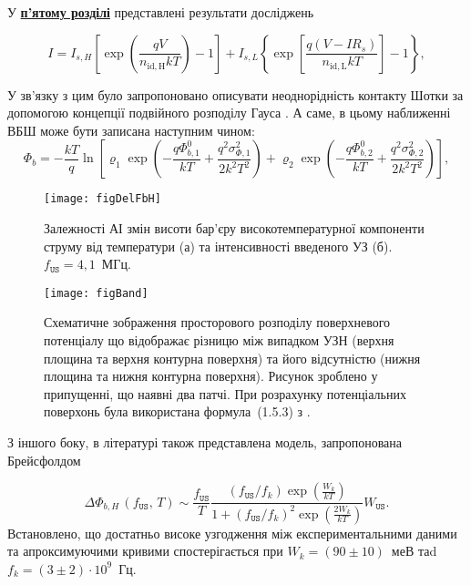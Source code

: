 \documentclass[a5paper,10pt,twoside,openany,article]{memoir} %
\begin{document}
У  \underline{\textbf{п'ятому розділі}} представлені результати досліджень

\begin{equation}
\label{eqSDB_IV}
  I=I_{s,H}\left[\exp\left(\frac{qV}{n_\mathrm{id,H}kT}\right)-1\right]+
 I_{s,L}\left\{\exp\left[\frac{q(V-IR_s)}{n_\mathrm{id,L}kT}\right]-1\right\},
\end{equation}


У зв'язку з цим було запропоновано описувати неоднорідність контакту Шотки за допомогою концепції подвійного розподілу Гауса \cite{Jiang:DG}.
А саме, в цьому наближенні ВБШ може бути записана наступним чином:
\begin{equation}
\label{eqDG}
  \Phi_b=-\frac{kT}{q}\ln\left[\varrho_1\exp\left(-\frac{q\Phi_{b,1}^0}{kT}+
  \frac{q^2\sigma^2_{\Phi,1}}{2k^2T^2}\right)
   +
  \varrho_2\exp\left(-\frac{q\Phi_{b,2}^{0}}{kT}+
  \frac{q^2\sigma^2_{\Phi,2}}{2k^2T^2}\right)\right],
\end{equation}

\begin{figure}
\center
\texttt{[image: figDelFbH]}
\caption{\label{figDelFbH}
Залежності АІ змін висоти бар'єру високотемпературної компоненти струму від температури (а) та інтенсивності введеного УЗ (б).
$f_\mathtt{US}=4,1$~МГц.
}%
\end{figure}


\begin{figure}
\center
\texttt{[image: figBand]}
\caption{\label{figBand}
Схематичне зображення 
просторового розподілу поверхневого потенціалу
що відображає різницю між випадком УЗН (верхня площина та верхня контурна поверхня) та
його відсутністю (нижня площина та нижня контурна поверхня).
Рисунок зроблено у припущенні, що наявні два патчі.
При розрахунку потенціальних поверхонь була використана формула~(1.5.3) з \cite{Tung:MSE}.
}%
\end{figure}


З іншого боку, в літературі \cite{Brailsford} також представлена модель, запропонована Брейсфолдом

\begin{equation}
\label{eqBr}
\Delta\Phi_{b,H}\,(f_\mathtt{US},\,T)\sim\frac{f_\mathtt{US}}{T}\frac{(f_\mathtt{US}/{f_k})\exp\left(\frac{W_k}{kT}\right)}
{1+(f_\mathtt{US}/{f_k})^2\exp\left(\frac{2W_k}{kT}\right)}W_\mathtt{US}.
\end{equation}
Встановлено, що достатньо високе узгодження між експериментальними даними та апроксимуючими кривими спостерігається
при  $W_k=(90\pm10)$~меВ таd $f_k=(3\pm2)\cdot10^9$~Гц.
\end{document}
